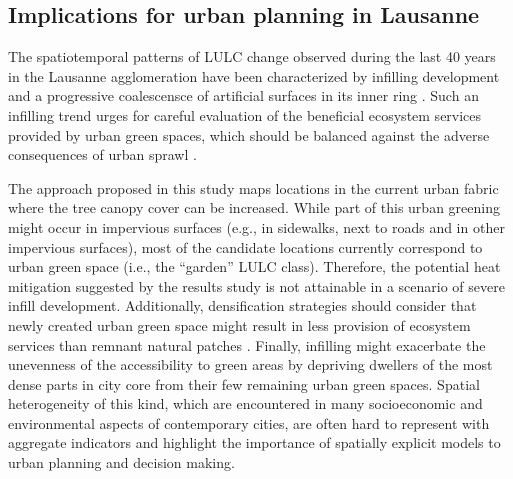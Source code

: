 \documentclass[10pt,letterpaper]{article}
\begin{document}



\subsection*{Implications for urban planning in Lausanne}

The spatiotemporal patterns of LULC change observed during the last 40 years in the Lausanne agglomeration have been characterized by infilling development and a progressive coalescensce of artificial surfaces in its inner ring \cite{bosch2020spatiotemporal}.
Such an infilling trend urges for careful evaluation of the beneficial ecosystem services provided by urban green spaces, which should be balanced against the adverse consequences of urban sprawl \cite{haaland2015challenges,artmann2019urban}.

The approach proposed in this study maps locations in the current urban fabric where the tree canopy cover can be increased.
While part of this urban greening might occur in impervious surfaces (e.g., in sidewalks, next to roads and in other impervious surfaces), most of the candidate locations currently correspond to urban green space (i.e., the ``garden'' LULC class).
Therefore, the potential heat mitigation suggested by the results study is not attainable in a scenario of severe infill development.
Additionally, densification strategies should consider that newly created urban green space might result in less provision of ecosystem services than remnant natural patches \cite{jim2013sustainable,sun2017effects,wang2019quantity}.
Finally, infilling might exacerbate the unevenness of the accessibility to green areas by depriving dwellers of the most dense parts in city core from their few remaining urban green spaces.  %
Spatial heterogeneity of this kind, which are encountered in many socioeconomic and environmental aspects of contemporary cities, are often hard to represent with aggregate indicators and highlight the importance of spatially explicit models to urban planning and decision making.
\end{document}
